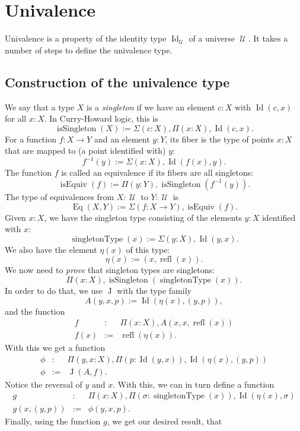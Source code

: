 \documentclass{article}
\newcommand{\Id}{\operatorname{Id}}
\newcommand{\J}{\operatorname{J}}
\newcommand{\refl}{\operatorname{refl}}
\newcommand{\U}{\operatorname{\mathcal{U}}}
\newcommand{\isSingleton}{\operatorname{isSingleton}}
\newcommand{\isEquiv}{\operatorname{isEquiv}}
\newcommand{\Eq}{\operatorname{Eq}}
\newcommand{\singletonType}{\operatorname{singletonType}}
\begin{document}
\section{Univalence}

Univalence is a property of the identity type $\Id_{\U}$ of a universe $\U$. It
takes a number of steps to define the univalence type.

\subsection{Construction of the univalence type}

We say that a type $X$ is a \emph{singleton} if we have an element $c:X$ with
$\Id(c,x)$ for all $x:X$. In Curry-Howard logic, this is
\[
    \isSingleton(X) := \Sigma(c:X), \Pi(x:X), \Id(c,x).
\]
For a function $f:X\to Y$ and an element $y:Y$, its fiber is the type of
points $x:X$ that are mapped to (a point identified with) $y$:
\[
    f^{-1}(y) := \Sigma(x:X),\Id(f(x),y).
\]
The function $f$ is called an equivalence if its fibers are all
singletons:
\[
    \isEquiv(f) := \Pi(y:Y), \isSingleton(f^{-1}(y)).
\]
The type of equivalences from $X:\U$ to $Y:\U$ is
\[
    \Eq(X,Y) := \Sigma(f:X\to Y), \isEquiv(f).
\]
Given $x:X$, we have the singleton type consisting of the elements $y:X$
identified with $x$:
\[
   \singletonType(x) := \Sigma(y:X), \Id(y,x).
\]
We also have the element $\eta(x)$ of this type:
\[
   \eta(x) := (x, \refl(x)).
\]
We now need to \emph{prove} that singleton types are singletons:
\[
   \Pi(x:X), \isSingleton(\singletonType(x)).
\]
In order to do that, we use $\J$ with the type family
\[
   A(y,x,p) := \Id(\eta(x),(y,p)),
\]
and the function 
\begin{eqnarray*}
  f & : & \Pi(x:X), A(x,x,\refl(x)) \\
   f(x) & := & \refl(\eta(x)).
\end{eqnarray*}
With this we get a function
\begin{eqnarray*}
   \phi & : & \Pi(y,x:X), \Pi(p:\Id(y,x)), \Id(\eta(x),(y,p)) \\
   \phi & := & \J(A,f).
\end{eqnarray*}
Notice the reversal of $y$ and $x$.
%
With this, we can in turn define a function
\begin{eqnarray*}
   g & : & \Pi(x:X), \Pi(\sigma :\singletonType(x)), \Id(\eta(x),\sigma ) \\
   g(x,(y,p)) & := & \phi(y,x,p).
\end{eqnarray*}
Finally, using the function $g$, we get our desired result, that
\end{document}

